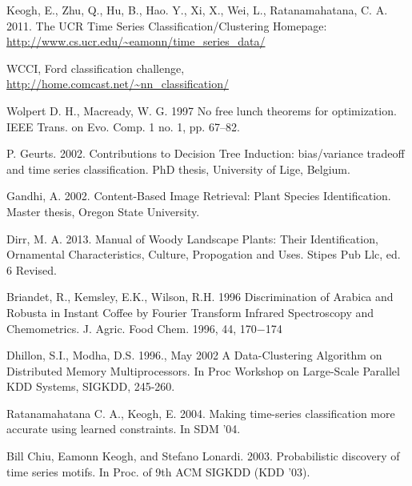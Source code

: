 \documentclass{llncs}
\begin{document}
\begin{thebibliography}{5}
Keogh, E., Zhu, Q., Hu, B., Hao. Y.,  Xi, X., Wei, L., Ratanamahatana, C. A. 2011.
The UCR Time Series Classification/Clustering Homepage:
\url{http://www.cs.ucr.edu/~eamonn/time_series_data/}

WCCI, Ford classification challenge, \url{http://home.comcast.net/~nn_classification/}

Wolpert D. H., Macready, W. G. 1997
No free lunch theorems for optimization.
IEEE Trans. on Evo. Comp. 1 no. 1, pp. 67--82.

P. Geurts. 2002.
Contributions to Decision Tree Induction: bias/variance tradeoﬀ and time series classiﬁcation.
PhD thesis, University of Lige, Belgium.

Gandhi, A. 2002.
Content-Based Image Retrieval: Plant Species Identification. 
Master thesis, Oregon State University.

Dirr, M. A. 2013.
Manual of Woody Landscape Plants: Their Identification, Ornamental Characteristics,
Culture, Propogation and Uses.
Stipes Pub Llc, ed. 6 Revised.

Briandet, R., Kemsley, E.K., Wilson, R.H. 1996
Discrimination of Arabica and Robusta in Instant Coffee by Fourier Transform Infrared Spectroscopy
and Chemometrics.
J. Agric. Food Chem. 1996, 44, 170−174

Dhillon, S.I., Modha, D.S. 1996., May 2002
A Data-Clustering Algorithm on Distributed Memory Multiprocessors. 
In Proc Workshop on Large-Scale Parallel KDD Systems, SIGKDD, 245-260.

Ratanamahatana C. A., Keogh, E. 2004.
Making time-series classification more accurate using learned constraints. 
In SDM '04.

Bill Chiu, Eamonn Keogh, and Stefano Lonardi. 2003. 
Probabilistic discovery of time series motifs. 
In Proc. of  9th ACM SIGKDD (KDD '03).


\end{thebibliography}

%
\end{document}
